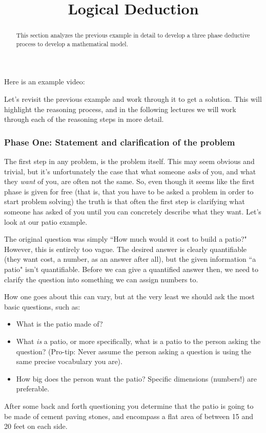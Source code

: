 \documentclass{ximera}
\title{Logical Deduction}
\begin{document}
\begin{abstract}
    This section analyzes the previous example in detail to develop a three phase deductive process to develop a mathematical model.
\end{abstract}
\maketitle

Here is an example video:



Let's revisit the previous example and work through it to get a solution. This will highlight the reasoning process, and in the following lectures we will work through each of the reasoning steps in more detail.

\subsubsection*{Phase One: Statement and clarification of the problem}

    \begin{explanation}
        The first step in any problem, is the problem itself. This may seem obvious and trivial, but it's unfortunately the case that what someone \textit{asks} of you, and what they \textit{want} of you, are often not the same. So, even though it seems like the first phase is given for free (that is, that you have to be asked a problem in order to start problem solving) the truth is that often the first step is clarifying what someone has asked of you until you can concretely describe what they want. Let's look at our patio example.
        
        The original question was simply ``How much would it cost to build a patio?" However, this is entirely too vague. The desired answer is clearly quantifiable (they want cost, a number, as an answer after all), but the given information ``a patio" isn't quantifiable. Before we can give a quantified answer then, we need to clarify the question into something we can assign numbers to.
        
        How one goes about this can vary, but at the very least we should ask the most basic questions, such as:
        \begin{itemize}
            \item What is the patio made of?
            \item What \textit{is} a patio, or more specifically, what is a patio to the person asking the question? (Pro-tip: Never assume the person asking a question is using the same precise vocabulary you are).
            \item How big does the person want the patio? Specific dimensions (numbers!) are preferable.
        \end{itemize}
        
        After some back and forth questioning you determine that the patio is going to be made of cement paving stones, and encompass a flat area of between 15 and 20 feet on each side.
    \end{explanation}
    
\end{document}
